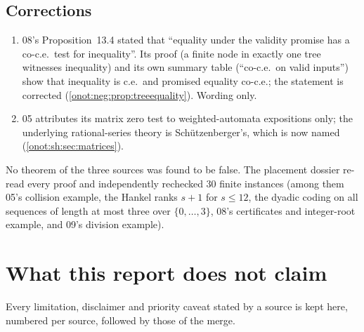 \documentclass[11pt,oneside]{article}
\numberwithin{equation}{section}
\theoremstyle{definition}
\theoremstyle{remark}
\begin{document}
\subsection{Corrections}\label{onot:app:corrections}

\begin{enumerate}[leftmargin=*]
\item 08's Proposition~13.4 stated that ``equality under the validity promise has a
co-c.e.\ test for inequality''. Its proof (a finite node in exactly one tree
witnesses inequality) and its own summary table (``co-c.e.\ on valid inputs'') show
that inequality is c.e.\ and promised equality co-c.e.; the statement is corrected
(\cref{onot:neg:prop:treeequality}). Wording only.
\item 05 attributes its matrix zero test to weighted-automata expositions only; the
underlying rational-series theory is Sch\"utzenberger's, which is now named
(\cref{onot:sh:sec:matrices}).
\end{enumerate}
No theorem of the three sources was found to be false. The placement dossier
re-read every proof and independently rechecked 30 finite instances (among them
05's collision example, the Hankel ranks $s+1$ for $s\le12$, the dyadic coding on
all sequences of length at most three over $\{0,\ldots,3\}$, 08's certificates and
integer-root example, and 09's division example).

\section{What this report does not claim}\label{onot:app:nonclaims}

Every limitation, disclaimer and priority caveat stated by a source is kept here,
numbered per source, followed by those of the merge.
\end{document}
